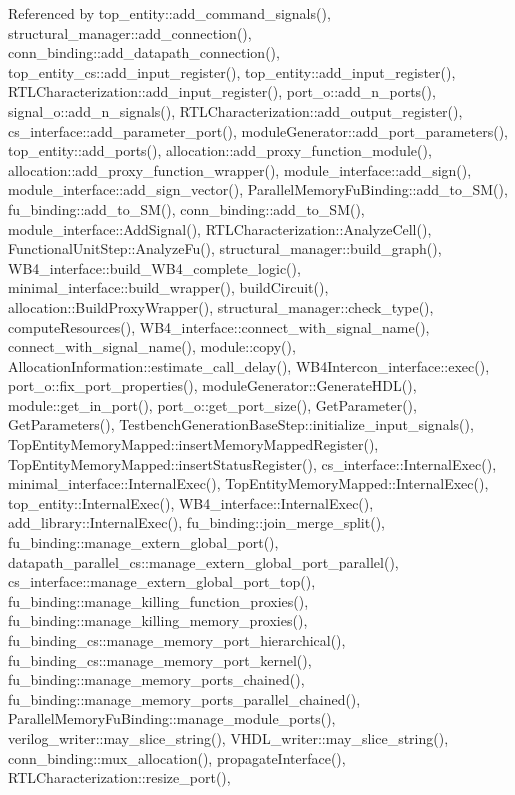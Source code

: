 Referenced by top\+\_\+entity\+::add\+\_\+command\+\_\+signals(), structural\+\_\+manager\+::add\+\_\+connection(), conn\+\_\+binding\+::add\+\_\+datapath\+\_\+connection(), top\+\_\+entity\+\_\+cs\+::add\+\_\+input\+\_\+register(), top\+\_\+entity\+::add\+\_\+input\+\_\+register(), R\+T\+L\+Characterization\+::add\+\_\+input\+\_\+register(), port\+\_\+o\+::add\+\_\+n\+\_\+ports(), signal\+\_\+o\+::add\+\_\+n\+\_\+signals(), R\+T\+L\+Characterization\+::add\+\_\+output\+\_\+register(), cs\+\_\+interface\+::add\+\_\+parameter\+\_\+port(), module\+Generator\+::add\+\_\+port\+\_\+parameters(), top\+\_\+entity\+::add\+\_\+ports(), allocation\+::add\+\_\+proxy\+\_\+function\+\_\+module(), allocation\+::add\+\_\+proxy\+\_\+function\+\_\+wrapper(), module\+\_\+interface\+::add\+\_\+sign(), module\+\_\+interface\+::add\+\_\+sign\+\_\+vector(), Parallel\+Memory\+Fu\+Binding\+::add\+\_\+to\+\_\+\+S\+M(), fu\+\_\+binding\+::add\+\_\+to\+\_\+\+S\+M(), conn\+\_\+binding\+::add\+\_\+to\+\_\+\+S\+M(), module\+\_\+interface\+::\+Add\+Signal(), R\+T\+L\+Characterization\+::\+Analyze\+Cell(), Functional\+Unit\+Step\+::\+Analyze\+Fu(), structural\+\_\+manager\+::build\+\_\+graph(), W\+B4\+\_\+interface\+::build\+\_\+\+W\+B4\+\_\+complete\+\_\+logic(), minimal\+\_\+interface\+::build\+\_\+wrapper(), build\+Circuit(), allocation\+::\+Build\+Proxy\+Wrapper(), structural\+\_\+manager\+::check\+\_\+type(), compute\+Resources(), W\+B4\+\_\+interface\+::connect\+\_\+with\+\_\+signal\+\_\+name(), connect\+\_\+with\+\_\+signal\+\_\+name(), module\+::copy(), Allocation\+Information\+::estimate\+\_\+call\+\_\+delay(), W\+B4\+Intercon\+\_\+interface\+::exec(), port\+\_\+o\+::fix\+\_\+port\+\_\+properties(), module\+Generator\+::\+Generate\+H\+D\+L(), module\+::get\+\_\+in\+\_\+port(), port\+\_\+o\+::get\+\_\+port\+\_\+size(), Get\+Parameter(), Get\+Parameters(), Testbench\+Generation\+Base\+Step\+::initialize\+\_\+input\+\_\+signals(), Top\+Entity\+Memory\+Mapped\+::insert\+Memory\+Mapped\+Register(), Top\+Entity\+Memory\+Mapped\+::insert\+Status\+Register(), cs\+\_\+interface\+::\+Internal\+Exec(), minimal\+\_\+interface\+::\+Internal\+Exec(), Top\+Entity\+Memory\+Mapped\+::\+Internal\+Exec(), top\+\_\+entity\+::\+Internal\+Exec(), W\+B4\+\_\+interface\+::\+Internal\+Exec(), add\+\_\+library\+::\+Internal\+Exec(), fu\+\_\+binding\+::join\+\_\+merge\+\_\+split(), fu\+\_\+binding\+::manage\+\_\+extern\+\_\+global\+\_\+port(), datapath\+\_\+parallel\+\_\+cs\+::manage\+\_\+extern\+\_\+global\+\_\+port\+\_\+parallel(), cs\+\_\+interface\+::manage\+\_\+extern\+\_\+global\+\_\+port\+\_\+top(), fu\+\_\+binding\+::manage\+\_\+killing\+\_\+function\+\_\+proxies(), fu\+\_\+binding\+::manage\+\_\+killing\+\_\+memory\+\_\+proxies(), fu\+\_\+binding\+\_\+cs\+::manage\+\_\+memory\+\_\+port\+\_\+hierarchical(), fu\+\_\+binding\+\_\+cs\+::manage\+\_\+memory\+\_\+port\+\_\+kernel(), fu\+\_\+binding\+::manage\+\_\+memory\+\_\+ports\+\_\+chained(), fu\+\_\+binding\+::manage\+\_\+memory\+\_\+ports\+\_\+parallel\+\_\+chained(), Parallel\+Memory\+Fu\+Binding\+::manage\+\_\+module\+\_\+ports(), verilog\+\_\+writer\+::may\+\_\+slice\+\_\+string(), V\+H\+D\+L\+\_\+writer\+::may\+\_\+slice\+\_\+string(), conn\+\_\+binding\+::mux\+\_\+allocation(), propagate\+Interface(), R\+T\+L\+Characterization\+::resize\+\_\+port(), 